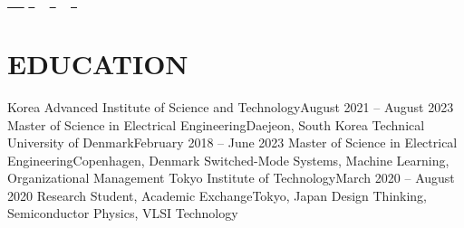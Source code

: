 \documentclass[a4paper,skipsamekey,12pt,english,final]{curve}
\begin{document}
 

\begin{center}
    {\Huge \scshape \name} \\ %
    \location \\ \vspace{1pt}
    \small \href{tel:\tel}{ \raisebox{-0.1\height}\faPhone\ \underline{\tel} ~} \href{mailto:\email}{\raisebox{-0.2\height}\faEnvelope\  \underline{\email}} ~ 
    \href{http://linkedin.com/in/\linkedin}{\raisebox{-0.2\height}\faLinkedin\ \underline{\linkedin}}  ~
    \href{http://github.com/\github}{\raisebox{-0.2\height}\faGithub\ \underline{\github}} ~
    \vspace{-8pt}
\end{center}


\section{EDUCATION}
  \resumeSubHeadingListStart
    \resumeSubheadingEdu
      {Korea Advanced Institute of Science and Technology}{August 2021 -- August 2023}
      {Master of Science in Electrical Engineering}{Daejeon, South Korea}{}
  \resumeSubHeadingListEnd
  \vspace{-15pt}
    \resumeSubHeadingListStart
   \resumeSubheadingEdu
     {Technical University of Denmark}{February 2018 -- June 2023}
     {Master of Science in Electrical Engineering}{Copenhagen, Denmark}
      {Switched-Mode Systems, Machine Learning, Organizational Management}
  \resumeSubHeadingListEnd
\vspace{-15pt}
  \resumeSubHeadingListStart
    \resumeSubheadingEdu
      {Tokyo Institute of Technology}{March 2020 -- August 2020}
      {Research Student, Academic Exchange}{Tokyo, Japan}
      {Design Thinking, Semiconductor Physics, VLSI Technology}
  \resumeSubHeadingListEnd
  \vspace{-15pt}
\end{document}
